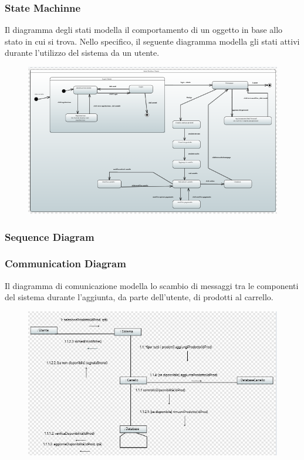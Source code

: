 \documentclass[a4paper,12pt]{article}
\begin{document}
\subsubsection{State Machinne}
Il diagramma degli stati modella il comportamento di un oggetto in base allo stato in cui si trova.
Nello specifico, il seguente diagramma modella gli stati attivi durante l'utilizzo del sistema da un utente.
\begin{figure}[H]
    \centering
    \includegraphics[width=1\textwidth]{../UML/UML png/StateMachine.png}
    \label{fig:State Machine}
\end{figure}
\subsubsection{Sequence Diagram}
\subsubsection{Communication Diagram}
Il diagramma di comunicazione modella lo scambio di messaggi tra le componenti del sistema durante l'aggiunta, da parte dell'utente, di prodotti al carrello.
\begin{figure}[H]
    \centering
    \includegraphics[width=1\textwidth]{../UML/UML png/CommunicationDiagram.png}
    \label{fig:Communication Diagram}
\end{figure}
\end{document}
